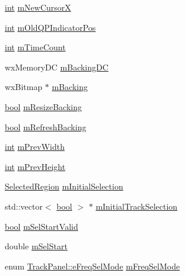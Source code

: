 \begin{DoxyCompactItemize}
\item 
\hyperlink{xmltok_8h_a5a0d4a5641ce434f1d23533f2b2e6653}{int} \hyperlink{class_track_panel_ab7dd0b337b738f9ed53c4cfa4375c604}{m\+New\+CursorX}
\item 
\hyperlink{xmltok_8h_a5a0d4a5641ce434f1d23533f2b2e6653}{int} \hyperlink{class_track_panel_a3db59897498463b3928e03fe5847a0aa}{m\+Old\+Q\+P\+Indicator\+Pos}
\item 
\hyperlink{xmltok_8h_a5a0d4a5641ce434f1d23533f2b2e6653}{int} \hyperlink{class_track_panel_ac49fa36d784ff704edbf92cafca23b7c}{m\+Time\+Count}
\item 
wx\+Memory\+DC \hyperlink{class_track_panel_acf9670b9b52fc68fb6d148e8c79cad95}{m\+Backing\+DC}
\item 
wx\+Bitmap $\ast$ \hyperlink{class_track_panel_a8006fb5dcc7b4611aab348b0f03ef9d2}{m\+Backing}
\item 
\hyperlink{mac_2config_2i386_2lib-src_2libsoxr_2soxr-config_8h_abb452686968e48b67397da5f97445f5b}{bool} \hyperlink{class_track_panel_ac5ec620aefdae3ab8b54bfe08e0fbf34}{m\+Resize\+Backing}
\item 
\hyperlink{mac_2config_2i386_2lib-src_2libsoxr_2soxr-config_8h_abb452686968e48b67397da5f97445f5b}{bool} \hyperlink{class_track_panel_a9c034b23c400af061256ab309776baf4}{m\+Refresh\+Backing}
\item 
\hyperlink{xmltok_8h_a5a0d4a5641ce434f1d23533f2b2e6653}{int} \hyperlink{class_track_panel_a5e5f21ee396e4dcddb50cec279b35dca}{m\+Prev\+Width}
\item 
\hyperlink{xmltok_8h_a5a0d4a5641ce434f1d23533f2b2e6653}{int} \hyperlink{class_track_panel_a2f4409a90287cd2316f2a1aa26608108}{m\+Prev\+Height}
\item 
\hyperlink{class_selected_region}{Selected\+Region} \hyperlink{class_track_panel_a5ad524f4ba9c00b92b9eebc81d016efe}{m\+Initial\+Selection}
\item 
std\+::vector$<$ \hyperlink{mac_2config_2i386_2lib-src_2libsoxr_2soxr-config_8h_abb452686968e48b67397da5f97445f5b}{bool} $>$ $\ast$ \hyperlink{class_track_panel_a2040148c3f847c66400e829f65eb9397}{m\+Initial\+Track\+Selection}
\item 
\hyperlink{mac_2config_2i386_2lib-src_2libsoxr_2soxr-config_8h_abb452686968e48b67397da5f97445f5b}{bool} \hyperlink{class_track_panel_ace0a09f928fd1f5a8c3d742df9b3592d}{m\+Sel\+Start\+Valid}
\item 
double \hyperlink{class_track_panel_a0d47f68da414e772c1074543a35fe759}{m\+Sel\+Start}
\item 
enum \hyperlink{class_track_panel_a84990c0ee0f5d646ae93808d15f458bf}{Track\+Panel\+::e\+Freq\+Sel\+Mode} \hyperlink{class_track_panel_a7001647bc10f3a935bc31f1afeb6ce53}{m\+Freq\+Sel\+Mode}

\end{DoxyCompactItemize}
